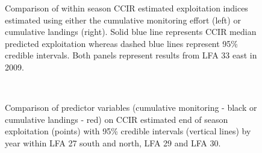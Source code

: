\documentclass[11pt]{article}
\newcommand{\D}{.}
\newcommand{\e}{/bio_data/bio.lobster/figures/LFA2733Framework2018} %
\begin{document}
\begin{landscape}
\begin{figure}
\centering
             \caption{Comparison of within season CCIR estimated exploitation indices estimated using either the cumulative monitoring effort (left) or cumulative landings (right). Solid blue line represents CCIR median predicted exploitation whereas dashed blue lines represent 95\% credible intervals. Both panels represent results from LFA 33 east in 2009.}
\end{figure}

\end{landscape}


\begin{figure}
        \centering
         \\
                 \caption{Comparison of predictor variables (cumulative monitoring - black or cumulative landings - red) on CCIR estimated end of season exploitation (points) with 95\% credible intervals (vertical lines) by year within LFA 27 south and north, LFA 29 and LFA 30.}
        \end{figure}
\end{document}

